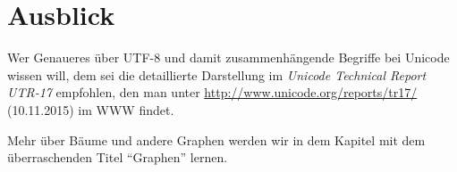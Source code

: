 \section{Ausblick}


Wer Genaueres über UTF-8 und damit zusammenhängende Begriffe bei
Unicode wissen will, dem sei die detaillierte Darstellung im \emph{Unicode
  Technical Report UTR-17} empfohlen, den man unter
\url{http://www.unicode.org/reports/tr17/} (10.11.2015) im WWW findet.

Mehr über Bäume und andere Graphen werden wir in dem Kapitel mit dem
überraschenden Titel "`Graphen"' lernen.

\cleardoublepage

